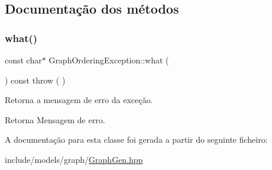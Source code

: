 \subsection{Documentação dos métodos}
\mbox{\label{classGraphOrderingException_a38d6f4e461cd40c0d2e8c07e7a5d6bef}} 
\subsubsection{\texorpdfstring{what()}{what()}}
{\footnotesize\ttfamily const char$\ast$ Graph\+Ordering\+Exception\+::what (\begin{DoxyParamCaption}{ }\end{DoxyParamCaption}) const throw ( ) \hspace{0.3cm}{\ttfamily [inline]}}

Retorna a mensagem de erro da exceção. \begin{DoxyReturn}{Retorna}
Mensagem de erro. 
\end{DoxyReturn}


A documentação para esta classe foi gerada a partir do seguinte ficheiro\+:\begin{DoxyCompactItemize}
\item 
include/models/graph/\mbox{\hyperlink{GraphGen_8hpp}{Graph\+Gen.\+hpp}}\end{DoxyCompactItemize}

